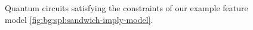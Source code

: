 \begin{figure}
{
    }
    \caption{Quantum circuits satisfying the constraints of our example feature model \ref{fig:bg:spl:sandwich-imply-model}.}
    \label{fig:impl:lookup-table-comparison}
\end{figure}


